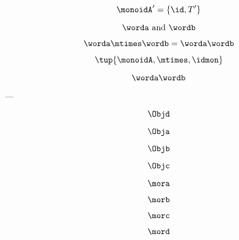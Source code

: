 {\begin{forslides}
        $$\monoidA' = \{ \id, T' \}$$

        \begin{equation*}
            \worda \text{ and } \wordb
        \end{equation*}

        \begin{equation*}
            \label{eq:string-semigroup-wordab-2}
            \worda \mtimes  \wordb =  \worda \wordb
        \end{equation*}

        $$ \tup{ \monoidA, \mtimes, \idmon} $$

        \begin{equation*}
            \label{eq:string-semigroup-wordab-concat-2}
            \worda \wordb
        \end{equation*}

        ---

        \begin{equation}
            \label{eq:00}
            \Objd
        \end{equation}

        \begin{equation}
            \label{eq:01}
            \Obja
        \end{equation}

        \begin{equation}
            \label{eq:02}
            \Objb
        \end{equation}

        \begin{equation}
            \label{eq:03}
            \Objc
        \end{equation}

        \begin{equation}
            \label{eq:04}
            \mora
        \end{equation}

        \begin{equation}
            \label{eq:05}
            \morb
        \end{equation}

        \begin{equation}
            \label{eq:06}
            \morc
        \end{equation}

        \begin{equation}
            \label{eq:07}
            \mord
        \end{equation}


\end{forslides}}
